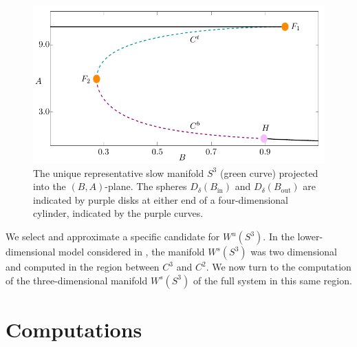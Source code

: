 \documentclass{ws-ijbc}
\begin{document}
\begin{figure}[!t]
\begin{center}
\includegraphics[page=2]{figures.pdf}
\end{center}
\caption{The unique representative slow manifold $S^3$ (green curve) projected into the $(B,A)$-plane.  The spheres $D_\delta(B_{\mathrm{in}})$ and $D_\delta(B_{\mathrm{out}})$ are indicated by purple disks at either end of a four-dimensional cylinder, indicated by the purple curves.}
\label{tube_figure}
\end{figure}

We select and approximate a specific candidate for $W^u(S^3)$.  In the lower-dimensional model considered in \cite{QSSA}, the manifold $W^s(S^3)$ was two dimensional and computed in the region between $C^3$ and $C^2$.  We now turn to the computation of the three-dimensional manifold $W^s(S^3)$ of the full system in this same region.

\section{Computations}
     
\end{document}
